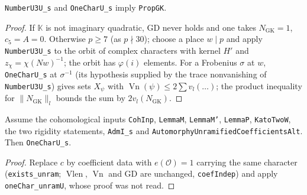 \begin{theorem}\label{sha:propgk-of}
\texttt{NumberU3U\_s} and \texttt{OneCharU\_s} imply \texttt{PropGK}.
\end{theorem}
\begin{proof}
If $\mathbb K$ is not imaginary quadratic, $\mathrm{GD}$ never holds and one takes
$N_{\mathrm{GK}}=1$, $c_5=A=0$. Otherwise $p\ge7$ (as $p\nmid30$); choose a place $w\mid p$
and apply \texttt{NumberU3U\_s} to the orbit of complex characters with kernel $H'$ and
$z_{\chi}=\chi(Nw)^{-1}$; the orbit has $\varphi(i)$ elements. For a Frobenius $\sigma$ at $w$,
\texttt{OneCharU\_s} at $\sigma^{-1}$ (its hypothesis supplied by the trace nonvanishing of
\texttt{NumberU3U\_s}) gives sets $X_{\psi}$ with $\operatorname{Vn}(\psi)\le2\sum v_l(\ldots)$;
the product inequality for $\|N_{\mathrm{GK}}\|_l$ bounds the sum by $2v_l(N_{\mathrm{GK}})$.
\end{proof}

\begin{lemma}\label{sha:onecharu}
Assume the cohomological inputs \texttt{CohInp}, \texttt{LemmaM}, \texttt{LemmaM'},
\texttt{LemmaP}, \texttt{KatoTwoW}, the two rigidity statements, \texttt{AdmI\_s} and
\texttt{AutomorphyUnramifiedCoefficientsAlt}. Then \texttt{OneCharU\_s}.
\end{lemma}
\begin{proof}
Replace $c$ by coefficient data with $e(\mathcal O)=1$ carrying the same character
(\texttt{exists\_unram}; $\operatorname{Vlen}$, $\operatorname{Vn}$ and $\mathrm{GD}$ are
unchanged, \texttt{coefIndep}) and apply \texttt{oneChar\_unramU}, whose proof was not read.
\end{proof}

